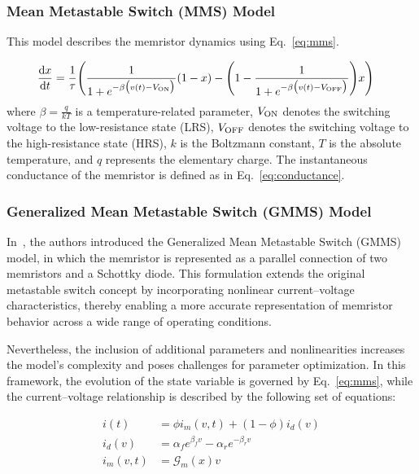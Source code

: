 \documentclass[11pt, oneside]{article}
\newcommand{\G}{\mathcal{G}}
\newcommand{\von}{V_{\rm ON}}
\newcommand{\voff}{V_{\rm OFF}}
\newcommand{\ua}{v}
\newcommand{\dert}[1]{\frac{{\rm d} {#1}}{{\rm d} t} }
\begin{document}
\subsubsection{Mean Metastable Switch (MMS) Model}

This model describes the memristor dynamics using Eq.~\eqref{eq:mms}.


\begin{align}
    \label{eq:mms}
    \dert{x} & =  \frac{1}{\tau} \Bigg( \frac{1}{1+e^{-\beta \big(\ua(t)-\von\big)}} (1-x)  -\Bigg(1- \frac{1}{1+e^{-\beta \big(\ua(t)-\voff\big)}} \Bigg) x \Bigg)
\end{align}
where $\beta= \frac{q}{kT}$ is a temperature-related parameter, $\von$ denotes the switching voltage to the low-resistance state (LRS), $\voff$ denotes the switching voltage to the high-resistance state (HRS), $k$ is the Boltzmann constant, $T$ is the absolute temperature, and $q$ represents the elementary charge. The instantaneous conductance of the memristor is defined as in Eq.~\eqref{eq:conductance}.

\subsubsection{Generalized Mean Metastable Switch (GMMS) Model}

In~\cite{Molter2016}, the authors introduced the Generalized Mean Metastable Switch (GMMS) model, in which the memristor is represented as a parallel connection of two memristors and a Schottky diode. This formulation extends the original metastable switch concept by incorporating nonlinear current--voltage characteristics, thereby enabling a more accurate representation of memristor behavior across a wide range of operating conditions.

Nevertheless, the inclusion of additional parameters and nonlinearities increases the model's complexity and poses challenges for parameter optimization. In this framework, the evolution of the state variable is governed by Eq.~\eqref{eq:mms}, while the current--voltage relationship is described by the following set of equations:


\begin{align}
    i(t)      & = \phi i_m(v, t) + (1-\phi) i_d(v)                 \\
    i_d(v)    & = \alpha_f e^{\beta_f v} - \alpha_r e^{-\beta_r v} \\
    i_m(v, t) & = \G_m(x) v
    \label{eq:gmms}
\end{align}
\end{document}

